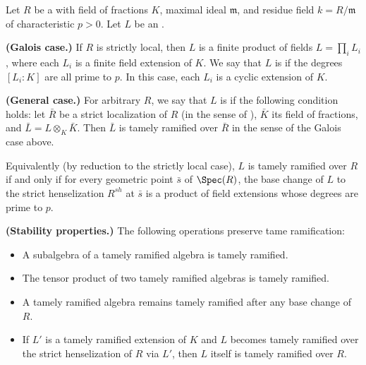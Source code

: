 \begin{definition} \label{definition:tamely_ramified_etale_algebra_over_a_dvr}
Let $R$ be a  with field of fractions $K$, maximal ideal $\mathfrak{m}$, and residue field $k = R/\mathfrak{m}$ of characteristic $p > 0$. Let $L$ be an .

\textbf{(Galois case.)} If $R$ is strictly local, then $L$ is a finite product of fields $L = \prod_i L_i$, where each $L_i$ is a finite field extension of $K$. We say that $L$ is  if the degrees $[L_i : K]$ are all prime to $p$. In this case, each $L_i$ is a cyclic extension of $K$.

\textbf{(General case.)} For arbitrary $R$, we say that $L$ is  if the following condition holds: let $\bar{R}$ be a strict localization of $R$ (in the sense of ), $\bar{K}$ its field of fractions, and $\bar{L} = L \otimes_K \bar{K}$. Then $\bar{L}$ is tamely ramified over $\bar{R}$ in the sense of the Galois case above.

Equivalently (by reduction to the strictly local case), $L$ is tamely ramified over $R$ if and only if for every geometric point $\bar{s}$ of $\Spec(R)$, the base change of $L$ to the strict henselization $R^{sh}$ at $\bar{s}$ is a product of field extensions whose degrees are prime to $p$.

\textbf{(Stability properties.)} The following operations preserve tame ramification:
\begin{itemize}
    \item A subalgebra of a tamely ramified algebra is tamely ramified.
    \item The tensor product of two tamely ramified algebras is tamely ramified.
    \item A tamely ramified algebra remains tamely ramified after any base change of $R$.
    \item If $L'$ is a tamely ramified extension of $K$ and $L$ becomes tamely ramified over the strict henselization of $R$ via $L'$, then $L$ itself is tamely ramified over $R$.
\end{itemize}
\end{definition}
